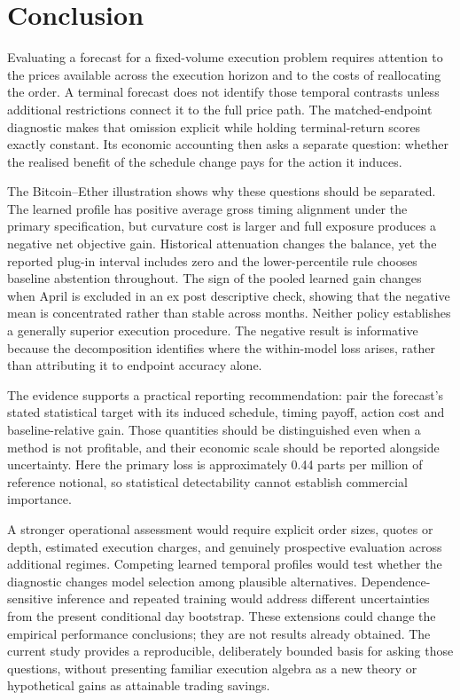 \section{Conclusion}\label{sec:conclusion}
Evaluating a forecast for a fixed-volume execution problem requires attention to the prices available across the execution horizon and to the costs of reallocating the order. A terminal forecast does not identify those temporal contrasts unless additional restrictions connect it to the full price path. The matched-endpoint diagnostic makes that omission explicit while holding terminal-return scores exactly constant. Its economic accounting then asks a separate question: whether the realised benefit of the schedule change pays for the action it induces.

The Bitcoin--Ether illustration shows why these questions should be separated. The learned profile has positive average gross timing alignment under the primary specification, but curvature cost is larger and full exposure produces a negative net objective gain. Historical attenuation changes the balance, yet the reported plug-in interval includes zero and the lower-percentile rule chooses baseline abstention throughout. The sign of the pooled learned gain changes when April is excluded in an ex post descriptive check, showing that the negative mean is concentrated rather than stable across months. Neither policy establishes a generally superior execution procedure. The negative result is informative because the decomposition identifies where the within-model loss arises, rather than attributing it to endpoint accuracy alone.

The evidence supports a practical reporting recommendation: pair the forecast's stated statistical target with its induced schedule, timing payoff, action cost and baseline-relative gain. Those quantities should be distinguished even when a method is not profitable, and their economic scale should be reported alongside uncertainty. Here the primary loss is approximately 0.44 parts per million of reference notional, so statistical detectability cannot establish commercial importance.

A stronger operational assessment would require explicit order sizes, quotes or depth, estimated execution charges, and genuinely prospective evaluation across additional regimes. Competing learned temporal profiles would test whether the diagnostic changes model selection among plausible alternatives. Dependence-sensitive inference and repeated training would address different uncertainties from the present conditional day bootstrap. These extensions could change the empirical performance conclusions; they are not results already obtained. The current study provides a reproducible, deliberately bounded basis for asking those questions, without presenting familiar execution algebra as a new theory or hypothetical gains as attainable trading savings.
